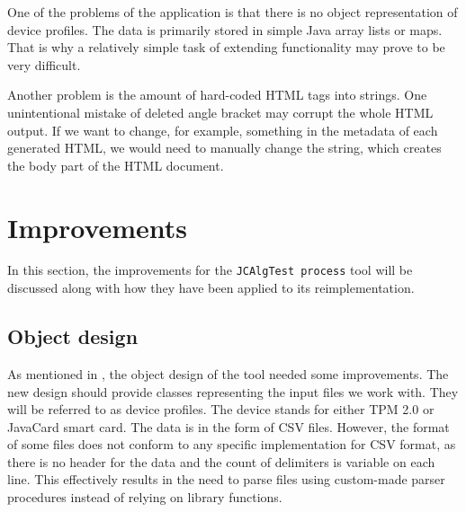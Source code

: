One of the problems of the application is that there is no object representation of device profiles. The data is primarily stored in simple Java array lists or maps. That is why a relatively simple task of extending functionality may prove to be very difficult. 

Another problem is the amount of hard-coded HTML tags into strings. One unintentional mistake of deleted angle bracket may corrupt the whole HTML output. If we want to change, for example, something in the metadata of each generated HTML, we would need to manually change the string, which creates the body part of the HTML document. 

\section{Improvements}
In this section, the improvements for the \texttt{JCAlgTest process} tool will be discussed along with how they have been applied to its reimplementation.

\subsection{Object design}
As mentioned in , the object design of the tool needed some improvements. The new design should provide classes representing the input files we work with. They will be referred to as device profiles. The device stands for either TPM 2.0 or JavaCard smart card. The data is in the form of CSV files. However, the format of some files does not conform to any specific implementation for CSV format, as there is no header for the data and the count of delimiters is variable on each line. This effectively results in the need to parse files using custom-made parser procedures instead of relying on library functions.

